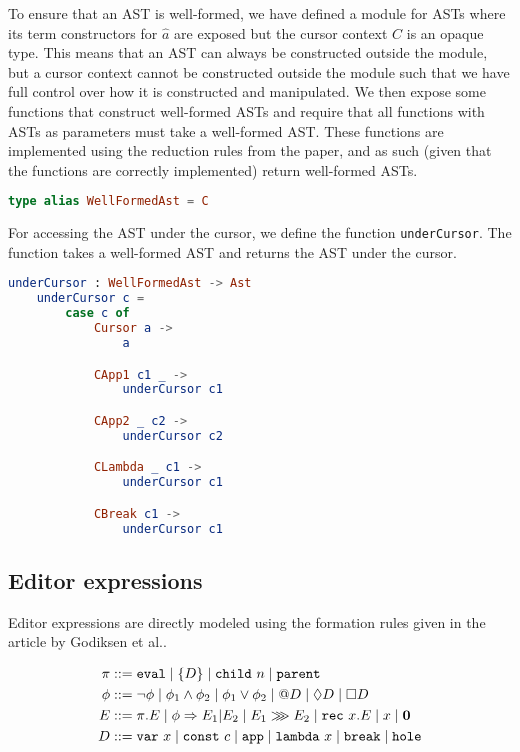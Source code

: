 To ensure that an AST is well-formed, we have defined a module for ASTs where
its term constructors for $\hat{a}$ are exposed but the cursor context $C$ is an
opaque type. This means that an AST can always be constructed outside the
module, but a cursor context cannot be constructed outside the module such that
we have full control over how it is constructed and manipulated. We then expose
some functions that construct well-formed ASTs and require that all functions
with ASTs as parameters must take a well-formed AST. These functions are
implemented using the reduction rules from the paper, and as such (given that
the functions are correctly implemented) return well-formed ASTs.
\begin{lstlisting}[language=elm,%
                   label={cursor-context-alias-elm},%
                   gobble=0,%
                   caption={Type alias for well-formed ASTs in Elm},%
                   ]
type alias WellFormedAst = C
\end{lstlisting}


For accessing the AST under the cursor, we define the function
\texttt{underCursor}. The function takes a well-formed AST and returns the AST
under the cursor.

\begin{lstlisting}[language=elm,%
    label="underCursor",%
    gobble=4,%
    ]
    underCursor : WellFormedAst -> Ast
    underCursor c =
        case c of
            Cursor a ->
                a

            CApp1 c1 _ ->
                underCursor c1

            CApp2 _ c2 ->
                underCursor c2

            CLambda _ c1 ->
                underCursor c1

            CBreak c1 ->
                underCursor c1
\end{lstlisting}

\subsection{Editor expressions}

Editor expressions are directly modeled using the formation rules given in the
article by Godiksen et al.\pepm.

\begin{align}
    \pi &::= \texttt{eval} \mid \{ D \} \mid \texttt{child}~n \mid \texttt{parent} \label{aep-formation-rules} \\
    \phi &::= \neg\phi \mid \phi_1 \land \phi_2 \mid \phi_1 \lor \phi_2 \mid @D \mid \Diamond D \mid \Box D \label{eed-formation-rules} \\
    E &::= \pi.E \mid \phi \Rightarrow E_1|E_2 \mid E_1 \ggg E_2 \mid \texttt{rec}~x.E \mid x \mid \mathbf{0} \label{edt-formation-rules} \\
    D &::= \texttt{var}~x \mid \texttt{const}~c \mid \texttt{app} \mid \texttt{lambda}~x \mid \texttt{break} \mid \texttt{hole} \label{aam-formation-rules}
\end{align}

